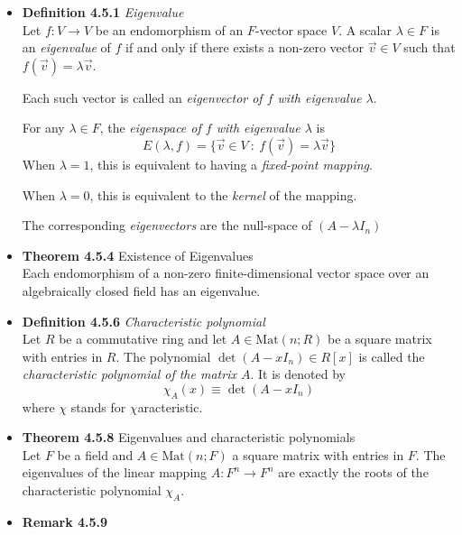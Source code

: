 \documentclass[11pt,a4paper]{article}
\begin{document}
\begin{itemize}
    \item \textbf{Definition 4.5.1} \emph{Eigenvalue} \\
        Let $f : V \to V$ be an endomorphism of an $F$-vector space $V$.
        A scalar $\lambda \in F$ is an \emph{eigenvalue} of $f$ if and only if there exists
        a non-zero vector $\vec{v} \in V$ such that $f(\vec{v}) = \lambda \vec{v}$.

        Each such vector is called an \emph{eigenvector of $f$ with eigenvalue $\lambda$}.

        For any $\lambda \in F$, the \emph{eigenspace of $f$ with eigenvalue $\lambda$} is
        \[
            E(\lambda, f) = \{ \vec{v} \in V \ : \ f(\vec{v}) = \lambda \vec{v} \}
        \]
        When $\lambda = 1$, this is equivalent to having a \emph{fixed-point mapping}.

        When $\lambda = 0$, this is equivalent to the \emph{kernel} of the mapping.

        The corresponding \emph{eigenvectors} are the null-space of $(A - \lambda I_n)$

    \item \textbf{Theorem 4.5.4} Existence of Eigenvalues \\
        Each endomorphism of a non-zero finite-dimensional vector space over an algebraically
        closed field has an eigenvalue.

    \item \textbf{Definition 4.5.6} \emph{Characteristic polynomial} \\
        Let $R$ be a commutative ring and let $A \in \mathrm{Mat}(n; R)$ be a square matrix
        with entries in $R$.
        The polynomial $\det (A - x I_n) \in R[x]$ is called the
        \emph{characteristic polynomial of the matrix $A$}.
        It is denoted by
        \[
            \chi_A (x) \equiv \det(A - x I_n)
        \]
        where $\chi$ stands for $\chi$aracteristic.

    \item \textbf{Theorem 4.5.8} Eigenvalues and characteristic polynomials \\
        Let $F$ be a field and $A \in \mathrm{Mat}(n; F)$ a square matrix with entries in $F$.
        The eigenvalues of the linear mapping $A : F^n \to F^n$ are exactly the roots of the
        characteristic polynomial $\chi_A$.

    \item \textbf{Remark 4.5.9}
        \begin{enumerate}


\end{enumerate}
\end{itemize}
\end{document}
